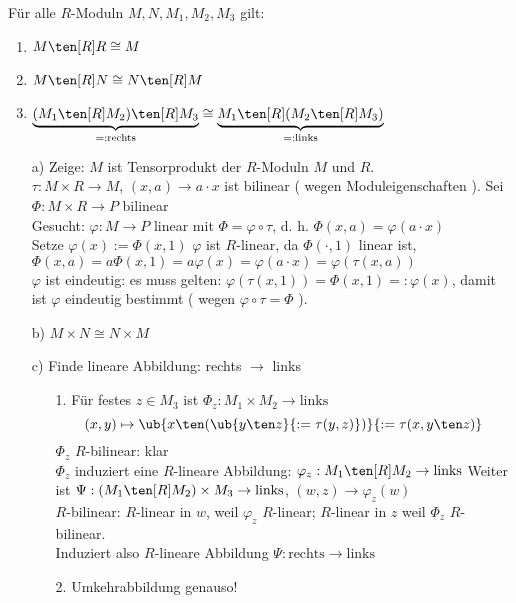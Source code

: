 \begin{Bem}
  Für alle $R$-Moduln $M, N, M_1, M_2, M_3$ gilt:
  \begin{enumerate}
  	\item $M \ten[R] R \cong M$
  	\item $M \ten[R] N \cong N \ten[R] M$
  	\item $\underbrace{(M_1 \ten[R] M_2) \ten[R] M_3}_{=: \text{rechts}} \cong 
	\underbrace{M_1 \ten[R] ( M_2 \ten[R] M_3)}_{=: \text{links}}$
  \end{enumerate}
\end{Bem}
\begin{Bew}
  \begin{enumerate}
    \item[a)] Zeige: $M$ ist Tensorprodukt der $R$-Moduln $M$ und $R$.\\
	  $\tau: M \times R \rightarrow M$, $(x,a) \rightarrow a \cdot x$ ist bilinear ( wegen 
	  Moduleigenschaften ). Sei $\Phi: M \times R \rightarrow P$ bilinear\\
	  Gesucht: $\varphi: M \rightarrow P$ linear mit $\Phi = \varphi \circ \tau$, d. h. 
	  $\Phi(x,a) = \varphi(a \cdot x)$\\
	  Setze $\varphi(x) := \Phi(x,1)$ $\varphi$ ist $R$-linear, da $\Phi( \cdot, 1)$ linear
	  ist, $\Phi(x,a) = a\Phi(x,1) = a\varphi(x) = \varphi(a \cdot x ) = \varphi(\tau(x,a))$\\
	  $\varphi$ ist eindeutig: es muss gelten: $\varphi(\tau(x,1)) = \Phi(x,1) =: \varphi(x)$, 
	  damit ist $\varphi$ eindeutig bestimmt ( wegen $\varphi \circ \tau = \Phi$ ).
    \item[b)] $M \times N \cong N \times M$
    \item[c)] Finde lineare Abbildung: rechts $\rightarrow$ links
	  \begin{enumerate}
	    \item[ 1. ] Für festes $z \in M_3$ ist $\Phi_z: M_1 \times M_2 \rightarrow \text{links}$ 
		  \[
		  (x,y) \mapsto \ub{x \ten (\ub{y \ten z}{:= \tau ( y,z )})}{:=\tau(x,y\ten z)}
		  \]
		  $\Phi_z$ $R$-bilinear: klar\\
		  $\Phi_z$ induziert eine $R$-lineare Abbildung: $\varphi_z: M_1 \ten[R] M_2 \rightarrow \text{links}$
		  Weiter ist $\Psi: ( M_1 \ten[R] M_2 ) \times M_3 \rightarrow \text{links}$,
		  $(w,z) \rightarrow \varphi_z (w)$\\
		  $R$-bilinear: $R$-linear in $w$, weil $\varphi_z$ $R$-linear; $R$-linear in $z$ weil $\Phi_z$ $R$-bilinear.\\
		  Induziert also $R$-lineare Abbildung $\Psi: \text{rechts} \rightarrow \text{links}$
	    \item[ 2. ] Umkehrabbildung genauso!
	  \end{enumerate}
  \end{enumerate}
\end{Bew}

